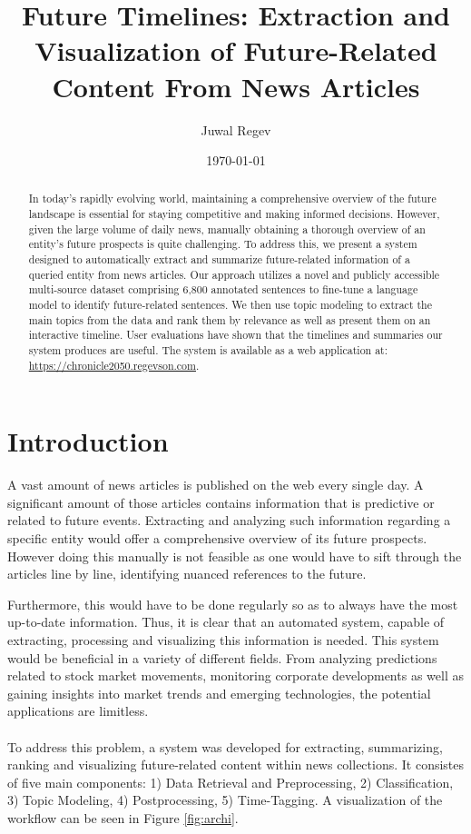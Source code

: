 \documentclass[a4paper,10pt]{report} %
\title{Future Timelines: Extraction and Visualization of Future-Related Content From News Articles}
\author{Juwal Regev}
\date{\today} %
\begin{document}
\maketitle

\begin{abstract}
In today's rapidly evolving world, maintaining a comprehensive overview of the future landscape is essential for staying competitive and making informed decisions. However, given the large volume of daily news, manually obtaining a thorough overview of an entity's future prospects is quite challenging. To address this, we present a system designed to automatically extract and summarize future-related information of a queried entity from news articles. Our approach utilizes a novel and publicly accessible multi-source dataset comprising 6,800 annotated sentences to fine-tune a language model to identify future-related sentences. We then use topic modeling to extract the main topics from the data and rank them by relevance as well as present them on an interactive timeline. User evaluations have shown that the timelines and summaries our system produces are useful. The system is available as a web application at: \url{https://chronicle2050.regevson.com}.
\end{abstract}

\tableofcontents

\chapter{Introduction}
A vast amount of news articles is published on the web every single day. A significant amount of those articles contains information that is predictive or related to future events. Extracting and analyzing such information regarding a specific entity would offer a comprehensive overview of its future prospects. However doing this manually is not feasible as one would have to sift through the articles line by line, identifying nuanced references to the future.

Furthermore, this would have to be done regularly so as to always have the most up-to-date information. Thus, it is clear that an automated system, capable of extracting, processing and visualizing this information is needed. This system would be beneficial in a variety of different fields. From analyzing predictions related to stock market movements, monitoring corporate developments as well as gaining insights into market trends and emerging technologies, the potential applications are limitless. 
\\\\
To address this problem, a system was developed for extracting, summarizing, ranking and visualizing future-related content within news collections. It consistes of five main components: 1) Data Retrieval and Preprocessing, 2) Classification, 3) Topic Modeling, 4) Postprocessing, 5) Time-Tagging. A visualization of the workflow can be seen in Figure \ref{fig:archi}.
\end{document}
